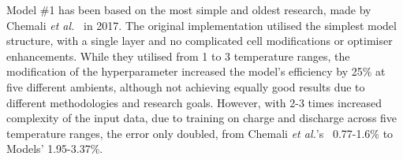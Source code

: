 
%
%
Model \#1 has been based on the most simple and oldest research, made by Chemali \textit{et al.}~\cite{Chemali2017} in 2017.
The original implementation utilised the simplest model structure, with a single layer and no complicated cell modifications or optimiser enhancements.
While they utilised from 1 to 3 temperature ranges, the modification of the hyperparameter increased the model's efficiency by 25\% at five different ambients, although not achieving equally good results due to different methodologies and research goals.
However, with 2-3 times increased complexity of the input data, due to training on charge and discharge across five temperature ranges, the error only doubled, from Chemali \textit{et al.}'s~\cite{Chemali2017} 0.77-1.6\% to Models' 1.95-3.37\%.

